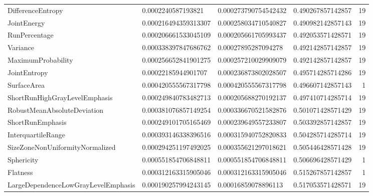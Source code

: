 {\begin{xltabular}[H]{\textwidth}{X l l l r}
    DifferenceEntropy                      & \num{0.0002240587193821}   & \num{0.000273790754542432} & \num{0.490267857142857} & 19\\
    JointEnergy                            & \num{0.000216494359313307} & \num{0.000258034710540827} & \num{0.490982142857143} & 19\\
    RunPercentage                          & \num{0.000206661533045109} & \num{0.000205661705993437} & \num{0.492053571428571} & 19\\
    Variance                               & \num{0.000338397847686762} & \num{0.00027895287094278}  & \num{0.492142857142857} & 19\\
    MaximumProbability                     & \num{0.000256652841901275} & \num{0.000257210029909079} & \num{0.492142857142857} & 19\\
    JointEntropy                           & \num{0.00022185944901707}  & \num{0.000236873802028507} & \num{0.495714285714286} & 19\\
    SurfaceArea                            & \num{0.000420555567317798} & \num{0.000420555567317798} & \num{0.496607142857143} & 1\\
    ShortRunHighGrayLevelEmphasis          & \num{0.000249840783482713} & \num{0.000205688270192137} & \num{0.497410714285714} & 19\\
    RobustMeanAbsoluteDeviation            & \num{0.000381076857149254} & \num{0.000336670521582876} & \num{0.501071428571429} & 19\\
    ShortRunEmphasis                       & \num{0.000249101705165469} & \num{0.000239649557233807} & \num{0.503392857142857} & 19\\
    InterquartileRange                     & \num{0.000393146338396516} & \num{0.000315940752820833} & \num{0.504285714285714} & 19\\
    SizeZoneNonUniformityNormalized        & \num{0.000294251197492025} & \num{0.000355621297018621} & \num{0.505446428571428} & 19\\
    Sphericity                             & \num{0.000551854706848811} & \num{0.000551854706848811} & \num{0.506696428571429} & 1\\
    Flatness                               & \num{0.000312163315905046} & \num{0.000312163315905046} & \num{0.515267857142857} & 1\\
    LargeDependenceLowGrayLevelEmphasis    & \num{0.000190257994243145} & \num{0.00016859078896113}  & \num{0.517053571428571} & 19\\

\end{xltabular}}
